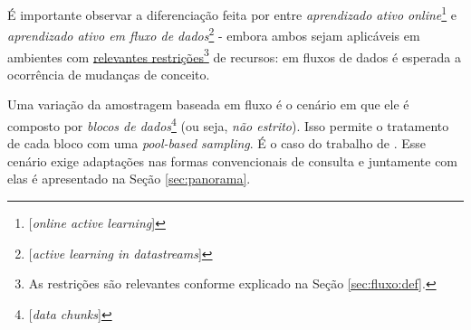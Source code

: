É importante observar a diferenciação feita por \cite{zliobaite2011active} entre
\textit{aprendizado ativo online}\footnote{[\textit{online active learning}]
}
 e \textit{aprendizado ativo em fluxo de dados}\footnote{[\textit{active learning in
datastreams}]
}
- embora ambos sejam aplicáveis em ambientes com
\underline{relevantes restrições}\footnote{As restrições são relevantes conforme explicado na
Seção
\ref{sec:fluxo:def}.
} de recursos:
em fluxos de dados é esperada a ocorrência de mudanças de conceito.

Uma variação da amostragem baseada em fluxo
é o cenário em que ele é composto por \textit{blocos de dados}\footnote{[\textit{data chunks}]
} (ou seja, \textit{não estrito}).
Isso permite o tratamento de cada bloco com uma \textit{pool-based sampling}.
É o caso do trabalho de \cite{zhu2007active}.
Esse cenário exige adaptações nas formas convencionais de consulta e juntamente com elas é
apresentado na Seção \ref{sec:panorama}.
